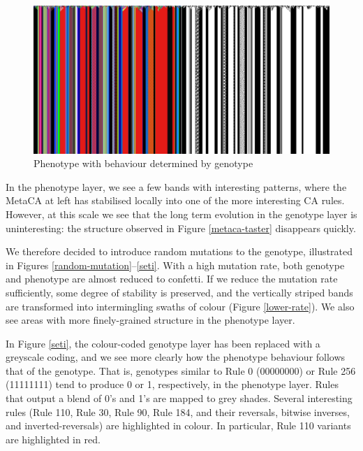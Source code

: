 \documentclass{AISB2008}
\begin{document}
\begin{figure}
\includegraphics[width=\columnwidth]{flag.png}
\caption{Phenotype with behaviour determined by genotype\label{flag}}
\end{figure}

In the phenotype layer, we see a few bands with interesting patterns,
where the MetaCA at left has stabilised locally into one of the more
interesting CA rules.  However, at this scale we see that the long
term evolution in the genotype layer is uninteresting: the structure
observed in Figure \ref{metaca-taster} disappears quickly.

We therefore decided to introduce random mutations to the genotype,
illustrated in Figures \ref{random-mutation}--\ref{seti}.  With a high
mutation rate, both genotype and phenotype are almost reduced to
confetti.  If we reduce the mutation rate sufficiently, some degree of
stability is preserved, and the vertically striped bands are
transformed into intermingling swaths of colour (Figure
\ref{lower-rate}).  We also see areas with more finely-grained
structure in the phenotype layer.  

In Figure \ref{seti}, the colour-coded genotype layer has been
replaced with a greyscale coding, and we see more clearly how the
phenotype behaviour follows that of the genotype.  That is, genotypes
similar to Rule 0 (00000000) or Rule 256 (11111111) tend to produce 0
or 1, respectively, in the phenotype layer.  Rules that output a blend
of 0's and 1's are mapped to grey shades.  Several interesting rules
(Rule 110, Rule 30, Rule 90, Rule 184, and their reversals, bitwise
inverses, and inverted-reversals) are highlighted in colour.  In
particular, Rule 110 variants are highlighted in red.

\end{document}
